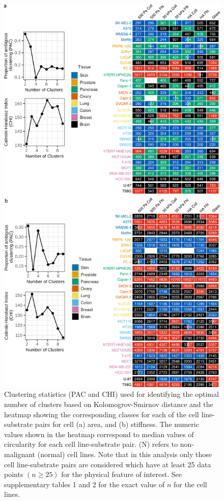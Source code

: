 \documentclass[11pt,letterpaper,english,oneside]{article} %
\begin{document}
\begin{figure}[H]
    \centering
    \includegraphics{../Figures/Supplementary_Figure14/supplementary_figure14.png}
    \caption{Clustering statistics (PAC and CHI) used for identifying the optimal number of clusters based on Kolomogrov-Smirnov distance and 
    the heatmap showing the corresponding classes for each of the cell line-substrate pairs for cell (a) area, and (b) stiffness. 
    The numeric values shown in the heatmap correspond to median values of circularity for each cell line-substrate pair. (N) refers to non-malignant (normal) cell lines. 
    Note that in this analysis only those cell line-substrate pairs are considered which have at least 25 data points $(n \geq 25)$ for the physical feature of interest.
    See supplementary tables 1 and 2 for the exact value of $n$ for the cell lines.}
    \label{fig:fig14}
\end{figure}
\end{document}
